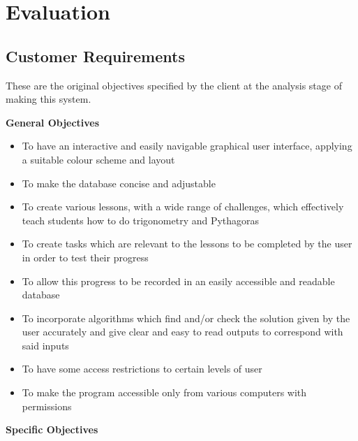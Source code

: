 \chapter{Evaluation}

\section{Customer Requirements}

These are the original objectives specified by the client at the analysis stage of making this system.

\textbf{General Objectives}

\begin{itemize}
	\item To have an interactive and easily navigable graphical user interface, applying a suitable colour scheme and layout
	\item To make the database concise and adjustable
	\item To create various lessons, with a wide range of challenges, which effectively teach students how to do trigonometry and Pythagoras
	\item To create tasks which are relevant to the lessons to be completed by the user in order to test their progress
	\item To allow this progress to be recorded in an easily accessible and readable database
	\item To incorporate algorithms which find and/or check the solution given by the user accurately and give clear and easy to read outputs to correspond with said inputs
	\item To have some access restrictions to certain levels of user
	\item To make the program accessible only from various computers with permissions
\end{itemize}

\textbf{Specific Objectives}

